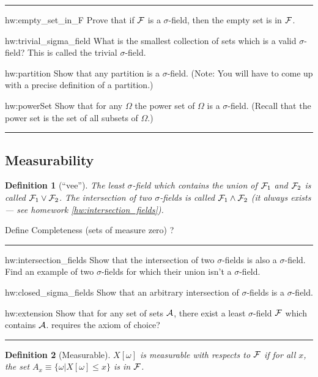 \documentclass[14pt]{extarticle}
\newtheorem{definition}{Definition}
\newenvironment{textHW}{
  \noindent\rule{\textwidth}{1pt}%
  \begin{list}{}{
      \setlength{\labelwidth}{1cm}
      \setlength{\labelsep}{0.3cm}
      \setlength{\leftmargin}{1.3cm}
      \setlength{\rightmargin}{1cm}
      \setlength{\parsep}{0.5ex plus0.2ex minus0.1ex}
      \setlength{\topsep}{1pt plus3pt minus1pt}
      \setlength{\itemsep}{0ex plus0.2ex} 
      \renewcommand{\makelabel}[1]{\label{thw:##1}{\ref{##1}}}
      \sl}}%
  {\end{list}\rule{\textwidth}{1pt}}
\newcommand{\notes}{}
\begin{document}
\begin{textHW}
\item[hw:empty_set_in_F] Prove that if ${\cal F}$ is a
  $\sigma$-field, then the empty set is in ${\cal F}$.
\item[hw:trivial_sigma_field] What is the smallest collection of sets
  which is a valid $\sigma$-field?  This is called the trivial
  $\sigma$-field. 
\item[hw:partition] Show that any partition is a $\sigma$-field.
  (Note: You will have to come up with a precise definition of a
  partition.)
\item[hw:powerSet] Show that for any $\Omega$ the power set of
  $\Omega$ is a $\sigma$-field.  (Recall that the power set is the
  set of all subsets of $\Omega$.)
\end{textHW}
        \subsection{Measurability}
%

 \begin{definition}[``vee''] \label{def:vee} The least
   $\sigma$-field which contains the union of ${\cal F}_1$ and ${\cal
     F}_2$ is called ${\cal F}_1 \vee {\cal F}_2$.  The intersection
   of two $\sigma$-fields is called $ {\cal F}_1 \wedge {\cal F}_2$
   (it always exists --- see homework \ref{hw:intersection_fields}).
 \end{definition}
 
{\notes Define Completeness (sets of measure zero) ?}
 
\begin{textHW}
\item[hw:intersection_fields] Show that the intersection of two
  $\sigma$-fields is also a $\sigma$-field.  Find an example of
  two $\sigma$-fields for which their  union isn't a
  $\sigma$-field. 
\item[hw:closed_sigma_fields] Show that an arbitrary intersection of
  $\sigma{}$-fields is a $\sigma{}$-field.
\item[hw:extension] Show that for any set of sets ${\cal A}$, there
  exist a least $\sigma$-field ${\cal F}$ which contains ${\cal A}$.
  {\notes requires the axiom of choice?}
\end{textHW}


\begin{definition}[Measurable] $X[\omega]$ is measurable with
  respects to ${\cal F}$ if for all $x$, the set $A_x \equiv
  \{\omega|X[\omega] \le x\}$ is in ${\cal F}$.  
\end{definition}
\end{document}
